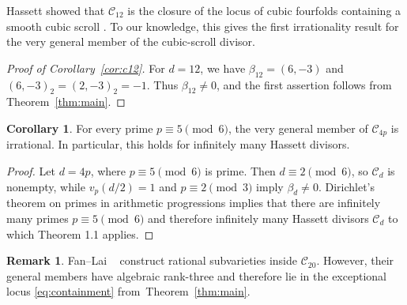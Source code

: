 \documentclass[10pt]{amsart}
\numberwithin{equation}{section}
\theoremstyle{definition}
\newtheorem{corollary}[theorem]{Corollary}
\newtheorem{remark}[theorem]{Remark}
\theoremstyle{plain}
\numberwithin{theorem}{section}
\begin{document}
 Hassett showed that $\mathcal C_{12}$ is the
closure of the locus of cubic fourfolds containing a smooth cubic scroll
\cite[Example~4.1.2]{hassett}. To our knowledge, this gives the first irrationality result for the very general member of the cubic-scroll divisor.

\begin{proof}[Proof of Corollary~\ref{cor:c12}] 
For $d=12$, we have $\beta_{12}=(6,-3)$ and $(6,-3)_2=(2,-3)_2=-1$. Thus $\beta_{12}\neq0$, and the first assertion follows from Theorem~\ref{thm:main}.
\end{proof}

\begin{corollary}
For every prime $p\equiv5\pmod6$, the very general member of
$\mathcal C_{4p}$ is irrational. In particular, this holds for
infinitely many Hassett divisors.
\end{corollary}
\begin{proof}
Let $d=4p$, where $p\equiv5\pmod6$ is prime. Then $d\equiv2\pmod6$, so $\mathcal C_d$ is nonempty, while $v_p(d/2)=1$ and $p\equiv2\pmod3$ imply $\beta_d\ne0$. Dirichlet's theorem on primes in arithmetic progressions implies that there are infinitely many primes $p\equiv5\pmod6$ and therefore infinitely many Hassett divisors $\mathcal C_{d}$ to which Theorem 1.1 applies.
\end{proof}

\begin{remark}
Fan--Lai ~\cite[Theorems~1.3 and 3.11]{Fan2020NewRC} construct rational subvarieties inside $\mathcal{C}_{20}$. However, their general members have algebraic rank-three and therefore lie in the exceptional locus \eqref{eq:containment} from~Theorem~\ref{thm:main}.
\end{remark}
\end{document}
